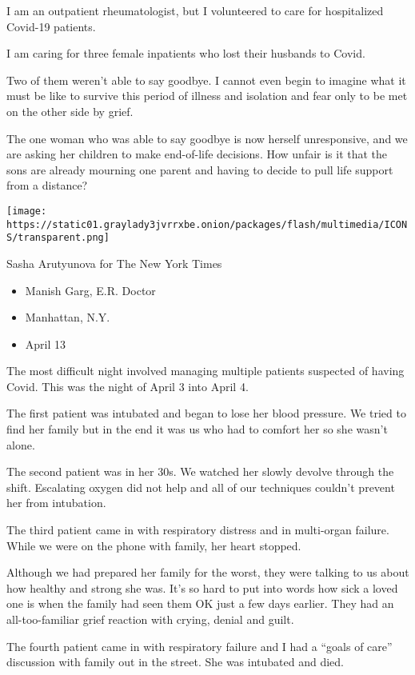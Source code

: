 I am an outpatient rheumatologist, but I volunteered to care for
hospitalized Covid-19 patients.

I am caring for three female inpatients who lost their husbands to
Covid.

Two of them weren't able to say goodbye. I cannot even begin to imagine
what it must be like to survive this period of illness and isolation and
fear only to be met on the other side by grief.

The one woman who was able to say goodbye is now herself unresponsive,
and we are asking her children to make end-of-life decisions. How unfair
is it that the sons are already mourning one parent and having to decide
to pull life support from a distance?

\texttt{[image: https://static01.graylady3jvrrxbe.onion/packages/flash/multimedia/ICONS/transparent.png]}

Sasha Arutyunova for The New York Times

\begin{itemize}
\tightlist
\item
  Manish Garg, E.R. Doctor
\item
  Manhattan, N.Y.
\item
  April 13
\end{itemize}

The most difficult night involved managing multiple patients suspected
of having Covid. This was the night of April 3 into April 4.

The first patient was intubated and began to lose her blood pressure. We
tried to find her family but in the end it was us who had to comfort her
so she wasn't alone.

The second patient was in her 30s. We watched her slowly devolve through
the shift. Escalating oxygen did not help and all of our techniques
couldn't prevent her from intubation.

The third patient came in with respiratory distress and in multi-organ
failure. While we were on the phone with family, her heart stopped.

Although we had prepared her family for the worst, they were talking to
us about how healthy and strong she was. It's so hard to put into words
how sick a loved one is when the family had seen them OK just a few days
earlier. They had an all-too-familiar grief reaction with crying, denial
and guilt.

The fourth patient came in with respiratory failure and I had a ``goals
of care'' discussion with family out in the street. She was intubated
and died.

